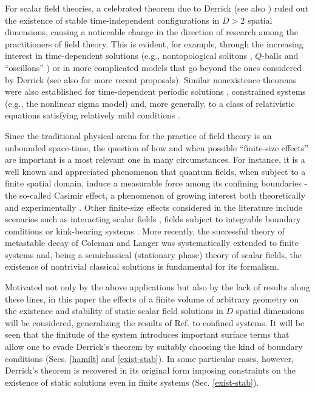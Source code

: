 \documentclass[a4paper,prd,twocolumn,showpacs,amsmath]{revtex4}
\begin{document}
For scalar field theories, a celebrated theorem due to Derrick \cite{derrick} (see also
\cite{dodd,rajaraman,coleman-book}) ruled out the existence of stable time-independent
configurations in $D>2$ spatial dimensions, causing a noticeable change in the direction of research
among the practitioners of field theory. This is evident, for example, through the increasing interest in
time-dependent solutions (e.g., nontopological solitons \cite{lee}, $Q$-balls \cite{coleman-qball}
and ``oscillons'' \cite{osc}) or in more complicated models that go beyond the ones considered by
Derrick \cite{rajaraman} (see also \cite{perivola} for more recent proposals).
Similar nonexistence theorems were also established for time-dependent periodic solutions
\cite{pagels}, constrained systems (e.g., the nonlinear sigma model) \cite{weder1} and, more generally,
to a class of relativistic equations satisfying relatively mild conditions \cite{weder2}.

Since the traditional physical arena for the practice of field theory is an unbounded space-time,
the question of how and when possible ``finite-size effects'' are important is a most relevant one in
many circumstances.
For instance, it is a well known and appreciated phenomenon that quantum fields, when subject to a finite
spatial domain, induce a measurable force among its confining boundaries - the so-called Casimir effect,
a phenomenon of growing interest both theoretically and experimentally \cite{casimir-review}.
Other finite-size effects considered in the literature include scenarios such as
interacting scalar fields \cite{carrillo}, fields subject to integrable boundary conditions \cite{bajnok}
or kink-bearing systems \cite{klassen}. More recently, the successful theory of metastable decay
of Coleman and Langer was systematically extended to finite systems \cite{maier-stein} and,
being a semiclassical (stationary phase) theory of scalar fields, the existence of nontrivial
classical solutions is fundamental for its formalism.

Motivated not only by the above applications but also by the lack of results along these lines, in
this paper the effects of a finite volume of arbitrary geometry on the existence and stability of
static scalar field solutions in $D$ spatial dimensions will be considered, generalizing the results of
Ref. \cite{derrick} to confined systems. It will be seen that the finitude of
the system introduces important surface terms that allow one to evade Derrick's theorem by suitably choosing
the kind of boundary conditions (Secs. \ref{hamilt} and \ref{exist-stab}). In some particular cases, however,
Derrick's theorem is recovered in its original form imposing constraints on the existence of static solutions
even in finite systems (Sec. \ref{exist-stab}).
\end{document}
